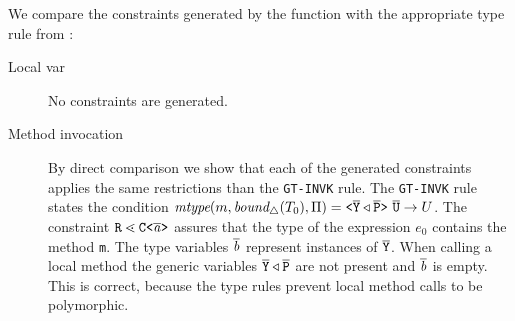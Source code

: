 \fi

We compare the constraints generated by the \typeExpr{} function with the appropriate type rule from \TFGJ:
\begin{description}
  \item [Local var]
  No constraints are generated.
  \item[Method invocation]
By direct comparison we show that each of the generated constraints applies the same restrictions than the \texttt{GT-INVK} rule.
The \texttt{GT-INVK} rule states the condition $\textit{mtype}(m, \textit{bound}_\triangle(T_0), \Pi) = \mathtt{ \texttt{<} \overline{\tt Y} \triangleleft \overline{\tt P} \texttt{>} }\ \overline{\tt U} \to U$.
The constraint $\texttt{R} \lessdot \mathtt{C \texttt{<} \overline{\tt \mathit{ a }} \texttt{>} }$ assures that the type of the expression $e_0$ contains the method \texttt{m}.
The type variables $\overline{\tt \mathit{ b }}$ represent instances of $\overline{\tt Y}$.
When calling a local method the generic variables $\overline{\tt Y} \triangleleft \overline{\tt P}$ are not present and $\overline{\tt \mathit{ b }}$ is empty.
This is correct, because the \TFGJ type rules prevent local method calls to be polymorphic.


\end{description}
